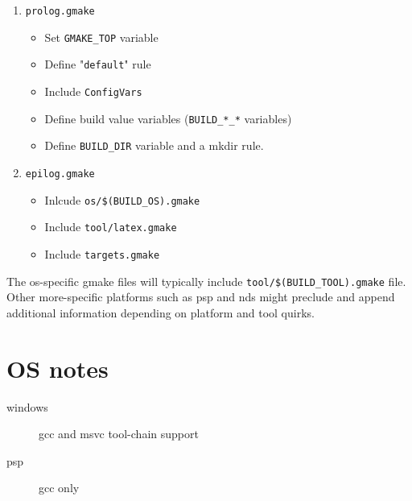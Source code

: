 \documentclass{article}
\newcommand{\var}[1]{{\tt #1}}
\newcommand{\val}[1]{"{\tt #1}"}
\newcommand{\file}[1]{{\tt #1}}
\begin{document}
\begin{enumerate}
\item \file{prolog.gmake}
\begin{itemize}
\item Set \var{GMAKE\_TOP} variable
\item Define \val{default} rule
\item Include \file{ConfigVars}
\item Define build value variables (\var{BUILD\_*\_*} variables)
\item Define \var{BUILD\_DIR} variable and a mkdir rule.
\end{itemize}
\item \file{epilog.gmake}
\begin{itemize}
\item Inlcude \file{os/\$(\var{BUILD\_OS}).gmake}
\item Include \file{tool/latex.gmake}
\item Include \file{targets.gmake}
\end{itemize}
\end{enumerate}

The os-specific gmake files will typically include 
\file{tool/\$(\var{BUILD\_TOOL}).gmake} file. 
Other more-specific platforms such as psp and nds might preclude and append additional information
depending on platform and tool quirks.

\section{OS notes}

\begin{description}
\item [windows] gcc and msvc tool-chain support
\item [psp] gcc only
\end{description}
\end{document}
